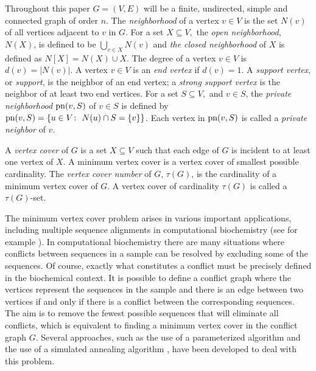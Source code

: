 \documentclass[12pt]{article}%
\theoremstyle{definition}
\begin{document}
Throughout this paper $G=(V,E)$ will be a finite, undirected,
simple and connected graph of order $n$.  The
\emph{neighborhood} of a vertex $v\in V$ is the set $N(v)$
of all vertices adjacent to $v$ in $G$. For a set  $X\subseteq
V,$ the \emph{open neighborhood}, $N(X)$, is defined to be
$\bigcup_{v\in X}N(v)$ and \emph{the closed neighborhood}
of $X$ is defined as $N[X]=N(X)\cup X.$ The degree of a
vertex $v\in V$ is $d(v)=|N(v)|$. A vertex $v\in V$ is an
\emph{end vertex} if $d(v)=1.$ A \emph{support vertex}, or
{\em support}, is the neighbor of an end vertex; a {\em strong
support vertex} is the neighbor of at least two end vertices.
For a set  $S\subseteq V,$ and $v \in S$, the {\em private
neighborhood} $\textnormal{pn}(v,S)$ of $v \in S$ is defined
by $\textnormal{pn}(v,S) = \{ u \in V \colon\ N(u) \cap S =
\{ v \} \}$.   Each vertex in $\textnormal{pn}(v,S)$ is called a
{\em private neighbor} of $v$.




A {\em vertex cover} of  $G$ is a set $X\subseteq V$ such
that each edge of $G$ is incident to at least one vertex of
$X$.  A minimum vertex cover is a vertex cover of smallest
possible cardinality. The \emph{vertex cover number} of
$G$, $\tau(G)$, is the cardinality of a minimum vertex cover
of $G$. A vertex cover of cardinality $\tau(G)$ is called a
$\tau(G)$-set. 



The minimum vertex cover problem arises in various
important applications, including multiple sequence
alignments in computational biochemistry (see for
example \cite{pirzadaJKSIAM11}). In computational
biochemistry there are many situations where conflicts
between sequences in a sample can be resolved by
excluding some of the sequences. Of course, exactly
what constitutes a conflict must be precisely defined
in the biochemical context. It is possible to define a
conflict graph where the vertices represent the
sequences in the sample and there is an edge between
two vertices if and only if there is a conflict between the
corresponding sequences. The aim is to remove the
fewest possible sequences that will eliminate all
conflicts, which is equivalent to finding a minimum
vertex cover in the conflict graph $G.$ Several
approaches, such as the use of a parameterized
algorithm \cite{downeyTCS141} and the use of a
simulated annealing algorithm \cite{xuN69},
have been developed to deal with this problem.
\end{document}
